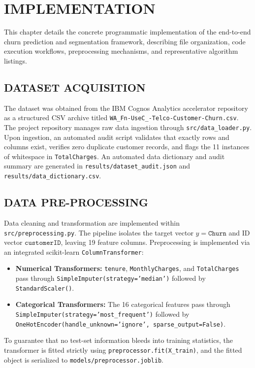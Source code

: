 \chapter{IMPLEMENTATION}

This chapter details the concrete programmatic implementation of the end-to-end churn prediction and segmentation framework, describing file organization, code execution workflows, preprocessing mechanisms, and representative algorithm listings.

\section{DATASET ACQUISITION}
The dataset was obtained from the IBM Cognos Analytics accelerator repository as a structured CSV archive titled \texttt{WA\_Fn-UseC\_-Telco-Customer-Churn.csv}. The project repository manages raw data ingestion through \texttt{src/data\_loader.py}. Upon ingestion, an automated audit script validates that exactly \datasetTotalRows{} rows and \datasetTotalCols{} columns exist, verifies zero duplicate customer records, and flags the 11 instances of whitespace in \texttt{TotalCharges}. An automated data dictionary and audit summary are generated in \texttt{results/dataset\_audit.json} and \texttt{results/data\_dictionary.csv}.

\section{DATA PRE-PROCESSING}
Data cleaning and transformation are implemented within \texttt{src/preprocessing.py}. The pipeline isolates the target vector $y = \texttt{Churn}$ and ID vector $\texttt{customerID}$, leaving 19 feature columns. Preprocessing is implemented via an integrated scikit-learn \texttt{ColumnTransformer}:
\begin{itemize}
    \item \textbf{Numerical Transformers:} \texttt{tenure}, \texttt{MonthlyCharges}, and \texttt{TotalCharges} pass through \texttt{SimpleImputer(strategy='median')} followed by \texttt{StandardScaler()}.
    \item \textbf{Categorical Transformers:} The 16 categorical features pass through \texttt{SimpleImputer(strategy='most\_frequent')} followed by \texttt{OneHotEncoder(handle\_unknown='ignore', sparse\_output=False)}.
\end{itemize}
To guarantee that no test-set information bleeds into training statistics, the transformer is fitted strictly using \texttt{preprocessor.fit(X\_train)}, and the fitted object is serialized to \texttt{models/preprocessor.joblib}.

